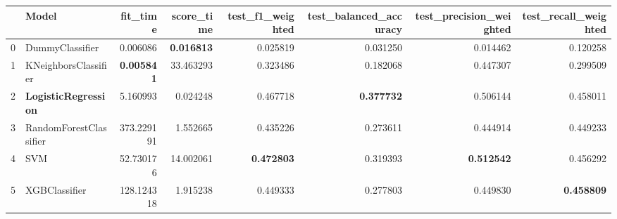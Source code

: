 \begin{tabular}{llrrrrrr}
				\toprule
				{} & Model & \textbf{fit\_time} & \textbf{score\_time} & \textbf{test\_f1\_weighted} & \textbf{test\_balanced\_accuracy} & \textbf{test\_precision\_weighted} & \textbf{test\_recall\_weighted} \\
				\midrule
				0 & DummyClassifier & 0.006086 & \textbf{0.016813} & 0.025819 & 0.031250 & 0.014462 & 0.120258 \\
				1 & KNeighborsClassifier & \textbf{0.005841} & 33.463293 & 0.323486 & 0.182068 & 0.447307 & 0.299509 \\
				2 & \textbf{LogisticRegression} & 5.160993 & 0.024248 & 0.467718 & \textbf{0.377732} & 0.506144 & 0.458011 \\
				3 & RandomForestClassifier & 373.229191 & 1.552665 & 0.435226 & 0.273611 & 0.444914 & 0.449233 \\
				4 & SVM & 52.730176 & 14.002061 & \textbf{0.472803} & 0.319393 & \textbf{0.512542} & 0.456292 \\
				5 & XGBClassifier & 128.124318 & 1.915238 & 0.449333 & 0.277803 & 0.449830 & \textbf{0.458809} \\
				\bottomrule
			\end{tabular}
